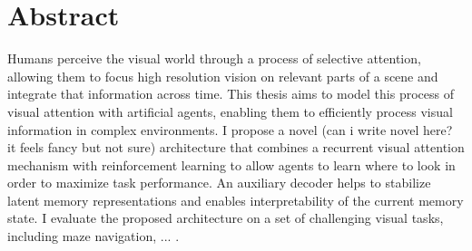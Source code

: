 \chapter*{Abstract}
Humans perceive the visual world through a process of selective attention, 
allowing them to focus high resolution vision on relevant parts of a scene and integrate that information across time.
This thesis aims to model this process of visual attention with artificial agents, enabling them to efficiently process visual information in complex environments.
I propose a novel (can i write novel here? it feels fancy but not sure) architecture that combines a recurrent visual attention mechanism with reinforcement learning to allow agents to learn where to look in order to maximize task performance.
An auxiliary decoder helps to stabilize latent memory representations and enables interpretability of the current memory state.
I evaluate the proposed architecture on a set of challenging visual tasks, including maze navigation, ... .
